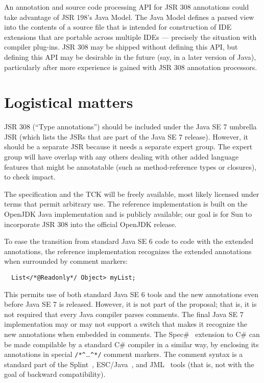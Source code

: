 \documentclass[10pt]{article}
\begin{document}
An annotation and source code processing API for JSR 308 annotations could
take advantage of JSR 198's Java Model.  The Java Model defines a parsed
view into the contents of a source file that is intended for construction
of IDE extensions that are portable across multiple IDEs --- precisely the
situation with compiler plug-ins.  JSR 308 may be shipped without defining
this API, but defining this API may be desirable in the future (say, in a
later version of Java), particularly after more experience is gained with
JSR 308 annotation processors.


\section{Logistical matters\label{logistics}}

JSR 308 (``Type annotations'') should be included under the Java SE 7
umbrella JSR (which lists the JSRs that are part of the Java SE 7 release).
However, it should be a separate JSR because it needs a separate expert group.
The expert group will have overlap with any others dealing with other
added language features that might be annotatable (such as method-reference
types or closures), to check impact.

The specification and the TCK will be freely available, most likely
licensed under terms that permit arbitrary use.  The reference
implementation is built on the OpenJDK Java implementation and is publicly
available; our goal is for Sun to incorporate JSR 308 into the official
OpenJDK release.

To ease the transition from standard Java SE 6 code to code with the extended
annotations, the reference implementation recognizes the extended
annotations when surrounded by comment markers:
\begin{Verbatim}
  List</*@Readonly*/ Object> myList;
\end{Verbatim}
This permits use of both standard Java SE 6 tools and the new annotations even
before Java SE 7 is released.  However, it is not part of the proposal;
that is, it is not required that every Java compiler parses comments.
The final Java SE 7 implementation may or may not support a switch that
makes it recognize the new annotations when embedded in comments.
The Spec\#~\cite{BarnettLS2004} extension to C\# can be made compilable by
a standard C\# compiler in a similar way, by enclosing its annotations in
special \verb|/*^|\ldots\verb|^*/| comment markers.
The  comment syntax is a standard part of the
Splint~\cite{Evans96}, ESC/Java~\cite{FlanaganLLNSS02}, and
JML~\cite{LeavensBR2006:JML} tools (that is, not
with the goal of backward compatibility).
\end{document}

